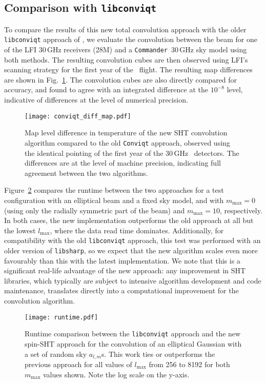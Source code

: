 \documentclass[twocolumn]{aa}
\def\commander{\texttt{Commander}}
\begin{document}
\subsection{Comparison with \texttt{libconviqt}}

To compare the results of this new total convolution approach with the older \texttt{libconviqt} approach of \citet{conviqt}, we evaluate the convolution between the beam for one of the LFI 30\,GHz receivers (28M) and a \commander\ 30\,GHz sky model \citep{bp13,bp14} using both methods. The resulting convolution cubes are then observed using LFI's scanning strategy for the first year of the \Planck\ flight. The resulting map differences are shown in Fig.~\ref{fig:differences}. The convolution cubes are also directly compared for accuracy, and found to agree with an integrated difference at the $10^{-8}$ level, indicative of differences at the level of numerical precision.

\begin{figure}[t]
  \center
  \texttt{[image: conviqt\_diff\_map.pdf]}
  \caption{Map level difference in temperature of the new SHT convolution algorithm compared to the old \texttt{Conviqt} approach, observed using the identical pointing of the first year of the 30\,GHz \Planck\ detectors. The differences are at the level of machine precision, indicating full agreement between the two algorithms. 
  }\label{fig:differences}
\end{figure}

Figure~\ref{fig:speed} compares the runtime between the two approaches for a test configuration with an elliptical beam and a fixed sky model, and with $m_\mathrm{max}=0$ (using only the radially symmetric part of the beam) and $m_\mathrm{max}=10$, respectively. In both cases, the new implementation outperforms the old approach at all but the lowest $l_\mathrm{max}$, where the data read time dominates. Additionally, for compatibility with the old \texttt{libconviqt} approach, this test was performed with an older version of \texttt{libsharp}, so we expect that the new algorithm scales even more favourably than this with the latest implementation. We note that this is a significant real-life advantage of the new approach: any improvement in SHT libraries, which typically are subject to intensive algorithm development and code maintenance, translates directly into a computational improvement for the convolution algorithm. 


\begin{figure}[t]
  \center
  \texttt{[image: runtime.pdf]}
	\caption{Runtime comparison between the \texttt{libconviqt} approach and the new spin-SHT approach for the convolution of an elliptical Gaussian with a set of random sky $a_{l,m}$s. This work ties or outperforms the previous approach for all values of $l_\mathrm{max}$ from 256 to 8192 for both $m_\mathrm{max}$ values shown. Note the log scale on the y-axis.
  }\label{fig:speed}
\end{figure}
\end{document}
